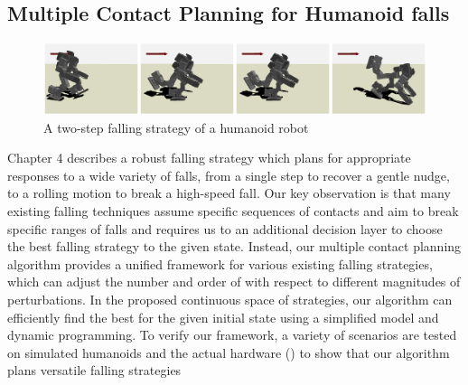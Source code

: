\subsection{Multiple Contact Planning for Humanoid falls}
\begin{figure}[h]
  \begin{center}
    \includegraphics[width=1.0\textwidth]{images/intro_gp_tripod}
  \end{center}
  \caption{A two-step falling strategy of a humanoid robot}
  \label{fig:intro_hardware}
\end{figure}
Chapter 4 describes a robust falling strategy which plans for appropriate 
responses to a wide variety of falls, from a single step to recover
 a gentle nudge, to a rolling motion to break a high-speed fall.
Our key observation is that many existing falling techniques
\cite{Wang:2012:WTO,Yun:2014:TFC,ZenpoUkemi:2014:URL}
assume specific sequences of contacts and aim to break specific ranges of
falls and requires us to an additional decision layer to choose the best
falling strategy to the given state.
Instead, our multiple contact planning algorithm provides a unified framework
for various existing falling strategies, which can adjust the number and order
of  with respect to different magnitudes of perturbations.
In the proposed continuous space of strategies, our algorithm can efficiently
find the best  for the given initial state using a
simplified model and dynamic programming.
To verify our framework, a variety of scenarios are tested on simulated
humanoids and the actual hardware () to show that our
algorithm plans versatile  falling strategies

